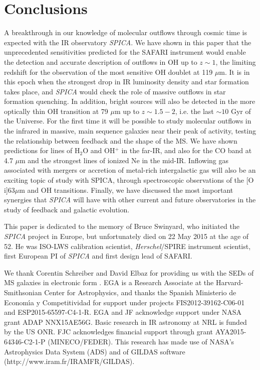 \documentclass{pasa}%
\begin{document}
\section{Conclusions}

A breakthrough in our knowledge of molecular outflows through cosmic
time is expected with the IR observatory {\it SPICA}. 
We have shown in this paper that the unprecedented sensitivities predicted for
the SAFARI instrument would enable the detection and accurate description of
outflows in OH up to $z\sim1$, the limiting redshift for the observation of
the most sensitive OH doublet at 119 $\mu$m. It is in this epoch
when the strongest drop in IR luminosity density and star formation takes
place, and {\it SPICA} would check the role of massive outflows in star
formation quenching. In addition, bright sources will
also be detected in the more optically thin OH transition at 79 $\mu$m up to
$z\sim1.5-2$, i.e. the last $\sim10$ Gyr of the Universe. 
For the first time it will be possible to study molecular outflows in the
  infrared in massive, main sequence galaxies near their peak of activity,
  testing the relationship between feedback and the shape of the MS. 
We have shown predictions for lines of H$_2$O and OH$^+$ in the far-IR,
and also for the CO band at 4.7 $\mu$m and the strongest lines of ionized Ne
in the mid-IR. Inflowing gas associated with mergers or accretion of
metal-rich intergalactic gas will also be an exciting topic of study with
SPICA, through spectroscopic observations of the [O {\sc i}]63$\mu$m and OH
transitions. Finally, we have discussed the most important synergies that 
{\it SPICA} will have with other current and future observatories in the
  study of feedback and galactic evolution. 



\begin{acknowledgements}
This paper is dedicated to the memory of Bruce Swinyard,
who initiated the {\it SPICA} project in Europe, but 
unfortunately died on 22 May 2015 at the age of 52. He was 
ISO-LWS calibration scientist, {\it Herschel}/SPIRE instrument 
scientist, first European PI of {\it SPICA} and first design lead 
of SAFARI.

We thank Corentin Schreiber and David Elbaz for providing us with the SEDs of
MS galaxies in electronic form \citep[reported in][]{sch15}.
EGA is a Research Associate at the Harvard-Smithsonian
Center for Astrophysics, and thanks the Spanish 
Ministerio de Econom\'{\i}a y Competitividad for support under projects
FIS2012-39162-C06-01 and  ESP2015-65597-C4-1-R. EGA and JF acknowledge support
under NASA grant ADAP NNX15AE56G. Basic research in IR astronomy at NRL
is funded by the US ONR. FJC acknowledges financial support through grant
AYA2015-64346-C2-1-P (MINECO/FEDER). 
This research has made use of NASA's Astrophysics Data System
(ADS) and of GILDAS software (http://www.iram.fr/IRAMFR/GILDAS).
\end{acknowledgements}
\end{document}
